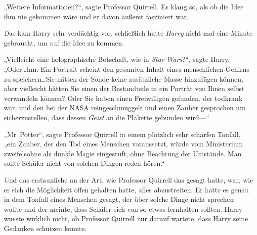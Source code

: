„Weitere Informationen?“, sagte Professor Quirrell. Es klang so, als ob die Idee ihm nie gekommen wäre und er davon äußerst fasziniert war.

Das kam Harry sehr verdächtig vor, schließlich hatte \emph{Harry} nicht mal eine Minute gebraucht, um auf die Idee zu kommen.

„Vielleicht eine holographische Botschaft, wie in \emph{Star Wars}?“, sagte Harry. „Oder…hm. Ein Portrait scheint den gesamten Inhalt eines menschlichen Gehirns zu speichern…Sie hätten der Sonde keine zusätzliche Masse hinzufügen können, aber vielleicht hätten Sie einen der Bestandteile in ein Porträt von Ihnen selbst verwandeln können? Oder Sie haben einen Freiwilligen gefunden, der todkrank war, und den bei der NASA reingeschmuggelt und einen Zauber gesprochen um sicherzustellen, dass dessen \emph{Geist} an die Plakette gebunden wird—“

„Mr~Potter“, sagte Professor Quirrell in einem plötzlich sehr scharfen Tonfall, „ein Zauber, der den Tod eines Menschen voraussetzt, würde vom Ministerium zweifelsohne als dunkle Magie eingestuft, ohne Beachtung der Umstände. Man sollte Schüler nicht von solchen Dingen reden hören.“

Und das erstaunliche an der Art, wie Professor Quirrell das gesagt hatte, war, wie er sich die Möglichkeit offen gehalten hatte, alles abzustreiten. Er hatte es genau in dem Tonfall eines Menschen gesagt, der über solche Dinge nicht sprechen wollte und der meinte, dass Schüler sich von so etwas fernhalten sollten. Harry wusste wirklich nicht, ob Professor Quirrell nur darauf wartete, dass Harry seine Gedanken schützen konnte.


